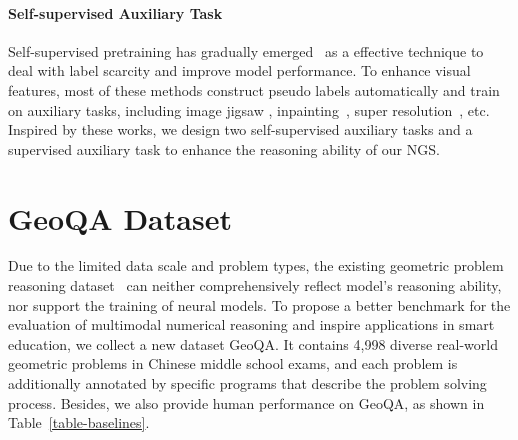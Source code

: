 \documentclass[11pt,a4paper]{article}
\begin{document}
\paragraph{Self-supervised Auxiliary Task}
Self-supervised pretraining has gradually emerged~\cite{doersch2017multi,newell2020useful} as a effective technique to deal with label scarcity and improve model performance. To enhance visual features, most of these methods construct pseudo labels automatically and train on auxiliary tasks, including image jigsaw \cite{noroozi2016unsupervised,ahsan2019video}, inpainting~\cite{pathak2016context}, super resolution~\cite{ledig2017photo}, etc. Inspired by these works, we design two self-supervised auxiliary tasks and a supervised auxiliary task to enhance the reasoning ability of our NGS.








\section{GeoQA Dataset}
Due to the limited data scale and problem types, the existing geometric problem reasoning dataset~\cite{seo2015solving} can neither comprehensively reflect model's reasoning ability, nor support the training of neural models.
To propose a better benchmark for the evaluation of multimodal numerical reasoning and inspire applications in smart education, we collect a new dataset GeoQA. It contains 4,998 diverse real-world geometric problems in Chinese middle school exams, and each problem is additionally annotated by specific programs that describe the problem solving process. Besides, we also provide human performance on GeoQA, as shown in Table~\ref{table-baselines}. 
\end{document}
